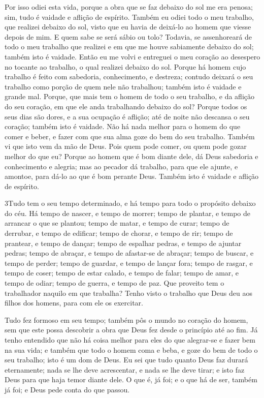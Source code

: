 Por isso odiei esta vida, porque a obra que se faz debaixo do sol
me era penosa; sim, tudo é vaidade e aflição de espírito.
Também eu odiei todo o meu trabalho, que realizei debaixo do
sol, visto que eu havia de deixá-lo ao homem que viesse depois de
mim. E quem sabe se será sábio ou tolo? Todavia, se
assenhoreará de todo o meu trabalho que realizei e em que me houve
sabiamente debaixo do sol; também isto é vaidade. Então eu me
volvi e entreguei o meu coração ao desespero no tocante ao trabalho,
o qual realizei debaixo do sol. Porque há homem cujo trabalho
é feito com sabedoria, conhecimento, e destreza; contudo deixará o
seu trabalho como porção de quem nele não trabalhou; também isto é
vaidade e grande mal. Porque, que mais tem o homem de todo o
seu trabalho, e da aflição do seu coração, em que ele anda
trabalhando debaixo do sol? Porque todos os seus dias são
dores, e a sua ocupação é aflição; até de noite não descansa o seu
coração; também isto é vaidade. Não há nada melhor para o
homem do que comer e beber, e fazer com que sua alma goze do bem do
seu trabalho. Também vi que isto vem da mão de Deus. Pois
quem pode comer, ou quem pode gozar melhor do que eu? Porque
ao homem que é bom diante dele, dá Deus sabedoria e conhecimento e
alegria; mas ao pecador dá trabalho, para que ele ajunte, e amontoe,
para dá-lo ao que é bom perante Deus. Também isto é vaidade e
aflição de espírito.

\medskip

\lettrine{3} Tudo tem o seu tempo determinado, e há tempo para
todo o propósito debaixo do céu. Há tempo de nascer, e tempo de
morrer; tempo de plantar, e tempo de arrancar o que se plantou;
tempo de matar, e tempo de curar; tempo de derrubar, e tempo de
edificar; tempo de chorar, e tempo de rir; tempo de prantear, e
tempo de dançar; tempo de espalhar pedras, e tempo de ajuntar
pedras; tempo de abraçar, e tempo de afastar-se de abraçar;
tempo de buscar, e tempo de perder; tempo de guardar, e tempo de
lançar fora; tempo de rasgar, e tempo de coser; tempo de estar
calado, e tempo de falar; tempo de amar, e tempo de odiar; tempo
de guerra, e tempo de paz. Que proveito tem o trabalhador
naquilo em que trabalha? Tenho visto o trabalho que Deus deu
aos filhos dos homens, para com ele os exercitar.

Tudo fez formoso em seu tempo; também pôs o mundo no coração do
homem, sem que este possa descobrir a obra que Deus fez desde o
princípio até ao fim. Já tenho entendido que não há coisa
melhor para eles do que alegrar-se e fazer bem na sua vida; e
também que todo o homem coma e beba, e goze do bem de todo o seu
trabalho; isto é um dom de Deus. Eu sei que tudo quanto Deus
faz durará eternamente; nada se lhe deve acrescentar, e nada se lhe
deve tirar; e isto faz Deus para que haja temor diante dele.
O que é, já foi; e o que há de ser, também já foi; e Deus
pede conta do que passou.

